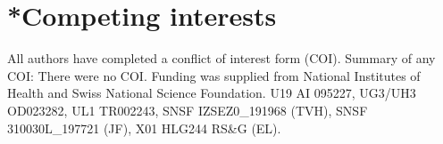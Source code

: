 \documentclass{article} %
\begin{document}
\section*{*Competing interests}
All authors have completed a conflict of interest form (COI). Summary of any COI:
There were no COI. Funding was supplied from National Institutes of Health 
and Swiss National Science Foundation.
U19 AI 095227, UG3/UH3 OD023282, UL1 TR002243, SNSF IZSEZ0\_191968   (TVH), SNSF 310030L\_197721 (JF), X01 HLG244 RS\&G (EL).

%

%
%
%
%
%
%
%
%
%
\end{document}
